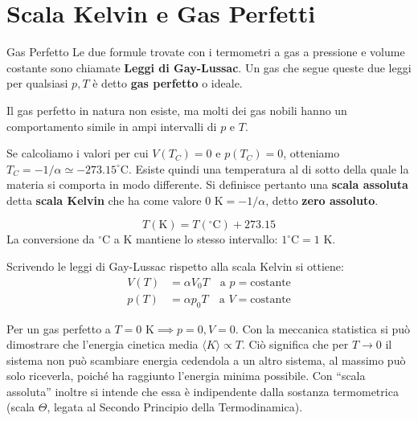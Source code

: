 \section{Scala Kelvin e Gas Perfetti}
\begin{definizione}{Gas Perfetto}
Le due formule trovate con i termometri a gas a pressione e volume costante sono chiamate \textbf{Leggi di Gay-Lussac}. Un gas che segue queste due leggi per qualsiasi $p, T$ è detto \textbf{gas perfetto} o ideale.
\end{definizione}

Il gas perfetto in natura non esiste, ma molti dei gas nobili hanno un comportamento simile in ampi intervalli di $p$ e $T$.

\medskip
Se calcoliamo i valori per cui $V(T_C) = 0$ e $p(T_C) = 0$, otteniamo $T_C = -1/\alpha \simeq -273.15^\circ\text{C}$.
Esiste quindi una temperatura al di sotto della quale la materia si comporta in modo differente. Si definisce pertanto una \textbf{scala assoluta} detta \textbf{scala Kelvin} che ha come valore $0\text{ K} = -1/\alpha$, detto \textbf{zero assoluto}.

\begin{equation}
\boxed{T(\text{K}) = T(^\circ\text{C}) + 273.15}
\end{equation}
La conversione da $^\circ\text{C}$ a K mantiene lo stesso intervallo: $1^\circ\text{C} = 1\text{ K}$.

Scrivendo le leggi di Gay-Lussac rispetto alla scala Kelvin si ottiene:
\begin{align}
    V(T) &= \alpha V_0 T \quad \text{a } p=\text{costante} \\
    p(T) &= \alpha p_0 T \quad \text{a } V=\text{costante}
\end{align}

Per un gas perfetto a $T=0\text{ K} \implies p=0, V=0$.
Con la meccanica statistica si può dimostrare che l'energia cinetica media $\langle K \rangle \propto T$. Ciò significa che per $T \to 0$ il sistema non può scambiare energia cedendola a un altro sistema, al massimo può solo riceverla, poiché ha raggiunto l'energia minima possibile.
Con ``scala assoluta'' inoltre si intende che essa è indipendente dalla sostanza termometrica (scala $\Theta$, legata al Secondo Principio della Termodinamica).


